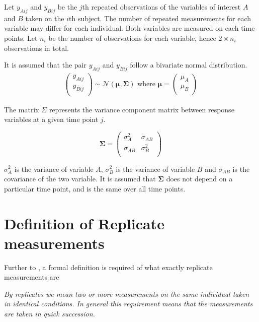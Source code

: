 \documentclass[12pt, a4paper]{report}
\theoremstyle{plain}
\theoremstyle{definition}
\theoremstyle{remark}
\begin{document}
	Let $y_{Aij}$ and $y_{Bij}$ be the $j$th repeated observations of the variables of interest $A$ and $B$ taken on the $i$th subject. The number of repeated measurements for each variable may differ for each individual.
	Both variables are measured on each time points. Let $n_{i}$ be the number of observations for each variable, hence $2\times n_{i}$ observations in total.
	
	It is assumed that the pair $y_{Aij}$ and $y_{Bij}$ follow a bivariate normal distribution.
	\begin{eqnarray*}
		\left(
		\begin{array}{c}
			y_{Aij} \\
			y_{Bij} \\
		\end{array}
		\right) \sim \mathcal{N}(
		\boldsymbol{\mu}, \boldsymbol{\Sigma})\mbox{   where } \boldsymbol{\mu} = \left(
		\begin{array}{c}
			\mu_{A} \\
			\mu_{B} \\
		\end{array}
		\right)
	\end{eqnarray*}
	
	The matrix $\Sigma$ represents the variance component matrix between response variables at a given time point $j$.
	
	\[
	\boldsymbol{\Sigma} = \left( \begin{array}{cc}
	\sigma^2_{A} & \sigma_{AB} \\
	\sigma_{AB} & \sigma^2_{B}\\
	\end{array}   \right)
	\]
	
	$\sigma^2_{A}$ is the variance of variable $A$, $\sigma^2_{B}$ is the variance of variable $B$ and $\sigma_{AB}$ is the covariance of the two variable. It is assumed that $\boldsymbol{\Sigma}$ does not depend on a particular time point, and is the same over all time points.
	
	
	
	
	\section{Definition of Replicate measurements}
	Further to \citet{BA99}, a formal definition is required of what exactly replicate measurements are
	
	\emph{By replicates we mean two or more measurements on the same
		individual taken in identical conditions. In general this requirement means that the
		measurements are taken in quick succession.}
	
\end{document}
